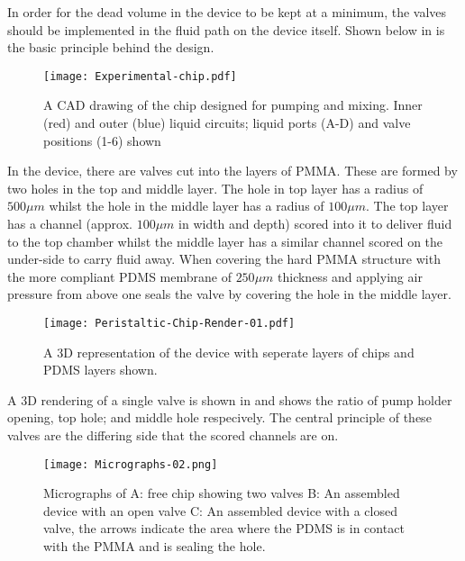 In order for the dead volume in the device to be kept at a minimum, the valves should be implemented in
the fluid path on the device itself. Shown below in  is the
basic principle behind the design.

\begin{figure}
  \begin{center}
  \texttt{[image: Experimental-chip.pdf]}
  \caption{A CAD drawing of the chip designed for pumping and mixing. Inner (red) and outer (blue) liquid circuits; liquid ports (A-D) and valve positions (1-6) shown}
  \label{fig:Chip}
  \end{center}
\end{figure}

In the device, there are valves cut into the layers of PMMA. These are formed by two holes
in the top and middle layer. The hole in top layer has a radius of $500 \mu m$ whilst the
hole in the middle layer has a radius of $100 \mu m$. The top layer has a channel (approx.
$100\mu m$ in width and depth) scored into it to deliver fluid to the top chamber whilst
the middle layer
has a similar channel scored on the under-side to carry fluid away. When covering the hard
PMMA structure with the more compliant PDMS membrane of $250 \mu m$ thickness and applying
air pressure from above one seals the valve by covering the hole in the middle layer.

\begin{figure}
  \begin{center}
  \texttt{[image: Peristaltic-Chip-Render-01.pdf]}
  \caption{A 3D representation of the device with seperate layers of chips and PDMS
  layers shown.}
  \label{fig:3Ddevice}
  \end{center}
\end{figure}

A 3D rendering of a single valve is shown in  and shows the ratio of pump holder opening, top hole; and middle hole respecively. The central principle of these valves
are the differing side that the scored channels are on.

\begin{figure}
  \begin{center}
  \texttt{[image: Micrographs-02.png]}
  \caption{Micrographs of A: free chip showing two valves B: An assembled device with an
  open valve C: An assembled device with a closed valve, the arrows indicate the area where the PDMS is
  in contact with the PMMA and is sealing the hole.}
  \label{fig:Micrographs}
  \end{center}
\end{figure}



